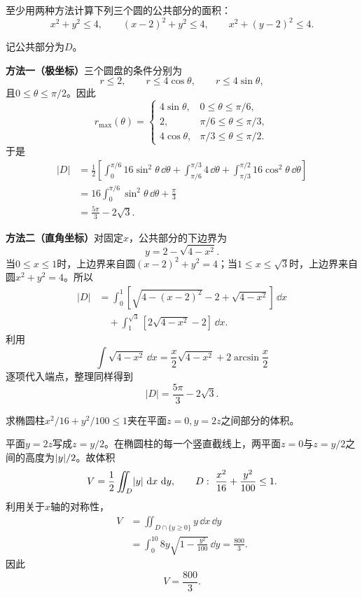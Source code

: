\begin{xexercise}[8]
至少用两种方法计算下列三个圆的公共部分的面积：
  \[
    x^2+y^2\le4,\qquad (x-2)^2+y^2\le4,\qquad x^2+(y-2)^2\le4.
  \]
\end{xexercise}
\begin{xsolution}
记公共部分为$D$。

\textbf{方法一（极坐标）}\quad 三个圆盘的条件分别为
\[
 r\le2,\qquad r\le4\cos\theta,\qquad r\le4\sin\theta,
\]
且$0\le\theta\le\pi/2$。因此
\[
 r_{\max}(\theta)=
 \begin{cases}
 4\sin\theta,&0\le\theta\le\pi/6,\\
 2,&\pi/6\le\theta\le\pi/3,\\
 4\cos\theta,&\pi/3\le\theta\le\pi/2.
 \end{cases}
\]
于是
\begin{align*}
|D|
&=\frac12\left[
\int_0^{\pi/6}16\sin^2\theta\,\dd\theta
+\int_{\pi/6}^{\pi/3}4\,\dd\theta
+\int_{\pi/3}^{\pi/2}16\cos^2\theta\,\dd\theta
\right]\\
&=16\int_0^{\pi/6}\sin^2\theta\,\dd\theta+\frac\pi3\\
&=\frac{5\pi}{3}-2\sqrt3.
\end{align*}

\textbf{方法二（直角坐标）}\quad 对固定$x$，公共部分的下边界为
\[
 y=2-\sqrt{4-x^2}.
\]
当$0\le x\le1$时，上边界来自圆$(x-2)^2+y^2=4$；当$1\le x\le\sqrt3$时，上边界来自圆$x^2+y^2=4$。所以
\begin{align*}
|D|
&=\int_0^1\left[\sqrt{4-(x-2)^2}-2+\sqrt{4-x^2}\right]\,\dd x\\
&\quad+\int_1^{\sqrt3}\left[2\sqrt{4-x^2}-2\right]\,\dd x.
\end{align*}
利用
\[
 \int\sqrt{4-x^2}\,\dd x
 =\frac x2\sqrt{4-x^2}+2\arcsin\frac x2
\]
逐项代入端点，整理同样得到
\[
 |D|=\boxed{\frac{5\pi}{3}-2\sqrt3}.
\]
\end{xsolution}


\begin{xexercise}[9]
求椭圆柱$x^2/16+y^2/100\le1$夹在平面$z=0,y=2z$之间部分的体积。
\end{xexercise}
\begin{xsolution}
平面$y=2z$写成$z=y/2$。在椭圆柱的每一个竖直截线上，两平面$z=0$与$z=y/2$之间的高度为$\lvert y\rvert/2$。故体积
\[
 V=\frac12\iint_D\lvert y\rvert\,\mathop{}\!\mathrm{d} x\,\mathop{}\!\mathrm{d} y,
 \qquad
 D:\ \frac{x^2}{16}+\frac{y^2}{100}\le1.
\]
利用关于$x$轴的对称性，
\begin{align*}
V&=\iint_{D\cap\{y\ge0\}}y\,\dd x\,\dd y\\
&=\int_0^{10}8y\sqrt{1-\frac{y^2}{100}}\,\dd y
=\frac{800}{3}.
\end{align*}
因此
\[
 \boxed{V=\frac{800}{3}}.
\]
\end{xsolution}


